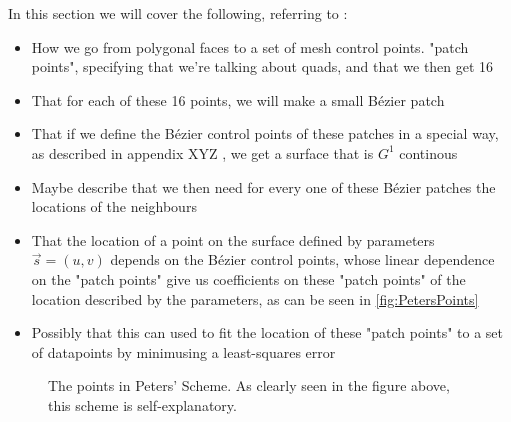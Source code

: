 In this section we will cover the following, referring to \cite{peters1992constructing}:
\begin{itemize}
\item How we go from polygonal faces to a set of mesh control points. "patch points", specifying that we're talking about quads, and that we then get 16
\item That for each of these 16 points, we will make a small B{\'e}zier patch
\item That if we define the B{\'e}zier control points of these patches in a special way, as described in appendix XYZ , we get a surface that is $G^1$ continous
\item Maybe describe that we then need for every one of these B{\'e}zier patches the locations of the neighbours
\item That the location of a point on the surface defined by parameters $\vec{s} = (u,v)$ depends on the B{\'e}zier control points, whose linear dependence on the "patch points" give us coefficients on these "patch points" of the location described by the parameters, as can be seen in \autoref{fig:PetersPoints}
\item Possibly that this can used to fit the location of these "patch points" to a set of datapoints by minimusing a least-squares error 
\end{itemize}
\begin{figure}

\label{fig:PetersPoints}
\caption{The points in Peters' Scheme. As clearly seen in the figure above, this scheme is self-explanatory.}
\end{figure}